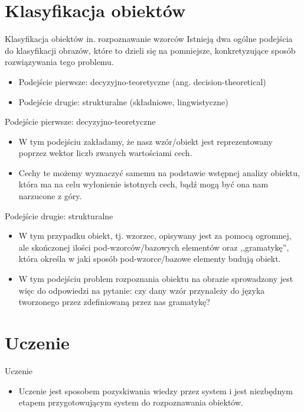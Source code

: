 \documentclass{beamer}
\begin{document}
\section{Klasyfikacja obiektów}
\begin{frame}{Klasyfikacja obiektów in. rozpoznawanie wzorców}
Istnieją dwa ogólne podejścia do klasyfikacji obrazów, które to dzieli się na pomniejsze, konkretyzujące sposób rozwiązywania tego problemu.
\pause
\begin{itemize}
\item Podejście pierwsze: decyzyjno-teoretyczne (ang. decision-theoretical)\
\pause
\item Podejście drugie: strukturalne (składniowe, lingwistyczne)
\end{itemize}
\end{frame}


\begin{frame}{Podejście pierwsze: decyzyjno-teoretyczne}
\begin{itemize}
\item W tym podejściu zakładamy, że nasz wzór/obiekt jest reprezentowany poprzez wektor liczb zwanych wartościami cech. 
\pause
\item Cechy te możemy wyznaczyć samemu na podstawie wstępnej analizy obiektu, która ma na celu wyłonienie istotnych cech, bądź mogą być ona nam narzucone z góry.
\end{itemize}
\end{frame}


\begin{frame}{Podejście drugie: strukturalne}
\begin{itemize}
\item W tym przypadku obiekt, tj. wzorzec, opisywany jest za pomocą ogromnej, ale skończonej ilości pod-wzorców/bazowych elementów oraz ,,gramatykę'', która określa w jaki sposób pod-wzorce/bazowe elementy budują obiekt.
\pause
\item W tym podejściu problem rozpoznania obiektu na obrazie sprowadzony jest więc do odpowiedzi na pytanie: czy dany wzór przynależy do języka tworzonego przez zdefiniowaną przez nas gramatykę?
\end{itemize}
\end{frame}


\section{Uczenie}
\begin{frame}{Uczenie}
\begin{itemize}
\item Uczenie jest sposobem pozyskiwania wiedzy przez system i jest niezbędnym etapem przygotowującym system do rozpoznawania obiektów.
\end{itemize}
\end{frame}
\end{document}
